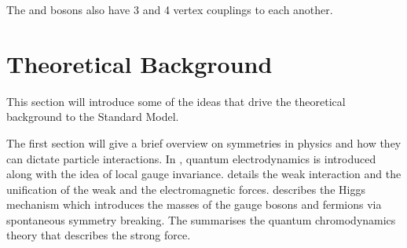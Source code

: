 The \PW and \PZ bosons also have 3 and 4 vertex couplings to each another.

\section{Theoretical Background}
\label{sec:forces}
This section will introduce some of the ideas that drive the
theoretical background to the Standard Model.


The first section will give a brief overview on symmetries in physics and how
they can dictate particle interactions. In , quantum
electrodynamics is introduced along with the idea of local gauge invariance.
 details the weak interaction and the unification of the weak 
and the electromagnetic forces.  describes the Higgs mechanism
which introduces the masses of the gauge bosons and fermions via spontaneous
symmetry breaking. The  summarises the quantum
chromodynamics theory that describes the strong force.

%
%
%

